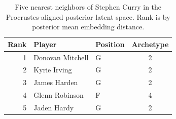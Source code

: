 \begin{table}[htbp]
  \centering\small
  \begin{tabular}{rllc}
    \toprule
    Rank & Player & Position & Archetype \\
    \midrule
    1 & Donovan Mitchell & G & 2 \\
    2 & Kyrie Irving & G & 2 \\
    3 & James Harden & G & 2 \\
    4 & Glenn Robinson & F & 4 \\
    5 & Jaden Hardy & G & 2 \\
    \bottomrule
  \end{tabular}
  \caption{Five nearest neighbors of Stephen Curry in the Procrustes-aligned posterior latent space. Rank is by posterior mean embedding distance.}
  \label{tab:Stephen_Curry_neighbors}
\end{table}


